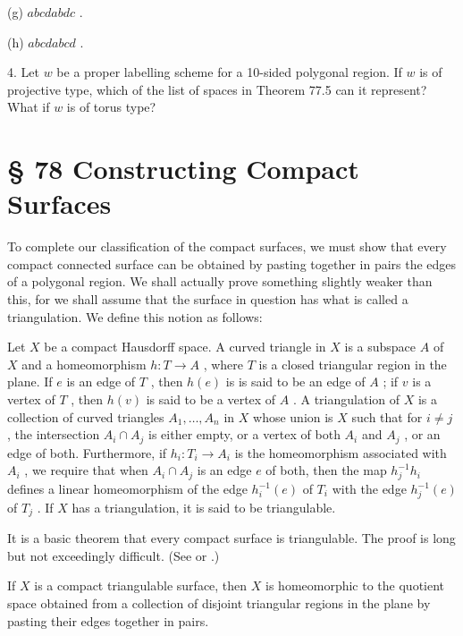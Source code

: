 (g) \({abcdabdc}\) .

(h) \({abcdabcd}\) .

4. Let \(w\) be a proper labelling scheme for a 10-sided polygonal region. If \(w\) is of projective type, which of the list of spaces in Theorem 77.5 can it represent? What if \(w\) is of torus type?

\section*{§ 78 Constructing Compact Surfaces}

To complete our classification of the compact surfaces, we must show that every compact connected surface can be obtained by pasting together in pairs the edges of a polygonal region. We shall actually prove something slightly weaker than this, for we shall assume that the surface in question has what is called a triangulation. We define this notion as follows:

\begin{definition} Let \(X\) be a compact Hausdorff space. A curved triangle in \(X\) is a subspace \(A\) of \(X\) and a homeomorphism \(h : T \rightarrow  A\) , where \(T\) is a closed triangular region in the plane. If \(e\) is an edge of \(T\) , then \(h\left( e\right)\) is is said to be an edge of \(A\) ; if \(v\) is a vertex of \(T\) , then \(h\left( v\right)\) is said to be a vertex of \(A\) . A triangulation of \(X\) is a collection of curved triangles \({A}_{1},\ldots ,{A}_{n}\) in \(X\) whose union is \(X\) such that for \(i \neq  j\) , the intersection \({A}_{i} \cap  {A}_{j}\) is either empty, or a vertex of both \({A}_{i}\) and \({A}_{j}\) , or an edge of both. Furthermore, if \({h}_{i} : {T}_{i} \rightarrow  {A}_{i}\) is the homeomorphism associated with \({A}_{i}\) , we require that when \({A}_{i} \cap  {A}_{j}\) is an edge \(e\) of both, then the map \({h}_{j}^{-1}{h}_{i}\) defines a linear homeomorphism of the edge \({h}_{i}^{-1}\left( e\right)\) of \({T}_{i}\) with the edge \({h}_{j}^{-1}\left( e\right)\) of \({T}_{j}\) . If \(X\) has a triangulation, it is said to be triangulable.
\end{definition}

It is a basic theorem that every compact surface is triangulable. The proof is long but not exceedingly difficult. (See 		\cite{AhlforsSario1960} or 		\cite{DoyleMoran1968}.)

\begin{theorem} If \(X\) is a compact triangulable surface, then \(X\) is homeomorphic to the quotient space obtained from a collection of disjoint triangular regions in the plane by pasting their edges together in pairs.
\end{theorem}

